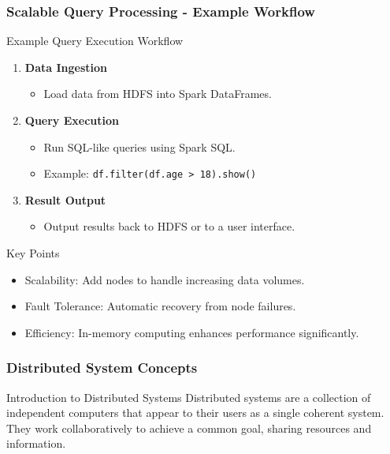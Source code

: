 \documentclass[aspectratio=169]{beamer}
\begin{document}
\begin{frame}[fragile]
    \frametitle{Scalable Query Processing - Example Workflow}
    \begin{block}{Example Query Execution Workflow}
        \begin{enumerate}
            \item \textbf{Data Ingestion}
                \begin{itemize}
                    \item Load data from HDFS into Spark DataFrames.
                \end{itemize}
            \item \textbf{Query Execution}
                \begin{itemize}
                    \item Run SQL-like queries using Spark SQL. 
                    \item Example: \texttt{df.filter(df.age > 18).show()}
                \end{itemize}
            \item \textbf{Result Output}
                \begin{itemize}
                    \item Output results back to HDFS or to a user interface.
                \end{itemize}
        \end{enumerate}
    \end{block}

    \begin{block}{Key Points}
        \begin{itemize}
            \item Scalability: Add nodes to handle increasing data volumes.
            \item Fault Tolerance: Automatic recovery from node failures.
            \item Efficiency: In-memory computing enhances performance significantly.
        \end{itemize}
    \end{block}
\end{frame}

\begin{frame}[fragile]
  \frametitle{Distributed System Concepts}
  \begin{block}{Introduction to Distributed Systems}
    Distributed systems are a collection of independent computers that appear to their users as a single coherent system. They work collaboratively to achieve a common goal, sharing resources and information.
  \end{block}
\end{frame}
\end{document}
